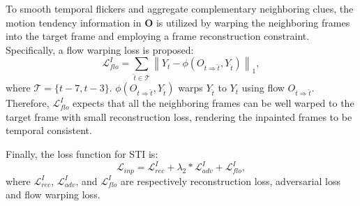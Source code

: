 To smooth temporal flickers and aggregate complementary neighboring clues, the motion tendency information in $\boldsymbol{O}$ is utilized by warping the neighboring frames into the target frame and employing a frame reconstruction constraint.
Specifically, a flow warping loss is proposed:
\begin{equation}
\label{eq:inp_flow}
\mathcal{L}^I_{flo}=\sum_{\widehat{t}\in\mathcal{T}}\left\| Y_t-\phi(O_{t\Rightarrow \widehat{t}},Y_{\widehat{t}}) \right\|_1,
\end{equation}
where $\mathcal{T}=\{t-7,t-3\}$. $\phi(O_{t\Rightarrow \widehat{t}},Y_{\widehat{t}})$ warps $Y_{\widehat{t}}$ to $Y_{t}$ using flow $O_{t\Rightarrow \widehat{t}}$.
Therefore, $\mathcal{L}^I_{flo}$ expects that all the neighboring frames can be well warped to the target frame with small reconstruction loss, rendering the inpainted frames to be temporal consistent.



Finally, the loss function for STI is:
\begin{equation}
\label{eq:inpain_all}
\mathcal{L}_{inp}=\mathcal{L}^{I}_{rec}+\lambda_2 * \mathcal{L}^I_{adv}+ \mathcal{L}^I_{flo},
\end{equation}
where $\mathcal{L}^{I}_{rec}$, $\mathcal{L}^I_{adv}$, and $\mathcal{L}^I_{flo}$ are respectively reconstruction loss, adversarial loss and flow warping loss.


